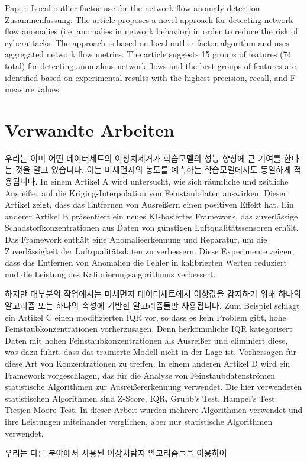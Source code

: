 Paper: Local outlier factor use for the network flow anomaly detection
Zusammenfassung: The article proposes a novel approach for detecting network flow anomalies (i.e. anomalies in network behavior) in order to reduce the risk of cyberattacks. The approach is based on local outlier factor algorithm and uses aggregated network flow metrics. The article suggests 15 groups of features (74 total) for detecting anomalous network flows and the best groups of features are identified based on experimental results with the highest precision, recall, and F-measure values.

\chapterpage\chapter{Verwandte Arbeiten}
    우리는 이미 어떤 데이터세트의 이상치제거가 학습모델의 성능 향상에 큰 기여를 한다는 것을 알고 있습니다. 이는 미세먼지의 농도를 예측하는 학습모델에서도 동일하게 적용됩니다. In einem Artikel A wird untersucht, wie sich räumliche und zeitliche Ausreißer auf die Kriging-Interpolation von Feinstaubdaten auswirken. Dieser Artikel zeigt, dass das Entfernen von Ausreißern einen positiven Effekt hat. Ein anderer Artikel B präsentiert ein neues KI-basiertes Framework, das zuverlässige Schadstoffkonzentrationen aus Daten von günstigen Luftqualitätssensoren erhält. Das Framework enthält eine Anomalieerkennung und Reparatur, um die Zuverlässigkeit der Luftqualitätsdaten zu verbessern. Diese Experimente zeigen, dass das Entfernen von Anomalien die Fehler in kalibrierten Werten reduziert und die Leistung des Kalibrierungsalgorithmus verbessert.

	하지만 대부분의 작업에서는 미세먼지 데이터세트에서 이상값을 감지하기 위해 하나의 알고리즘 또는 하나의 속성에 기반한 알고리즘들만 사용됩니다. Zum Beispiel schlagt ein Artikel C einen modifizierten IQR vor, so dass es kein Problem gibt, hohe Feinstaubkonzentrationen vorherzusagen. Denn herkömmliche IQR kategorisert Daten mit hohen Feinstaubkonzentrationen als Ausreißer und eliminiert diese, was dazu führt, dass das trainierte Modell nicht in der Lage ist, Vorhersagen für diese Art von Konzentrationen zu treffen. In einem anderen Artikel D wird ein Framework vorgeschlagen, das für die Analyse von Feinstaubdatenströmen statistische Algorithmen zur Ausreißererkennung verwendet. Die hier verwendeten statistischen Algorithmen sind Z-Score, IQR, Grubb's Test, Hampel's Test, Tietjen-Moore Test. In dieser Arbeit wurden mehrere Algorithmen verwendet und ihre Leistungen miteinander verglichen, aber nur statistische Algorithmen verwendet.

	우리는 다른 분야에서 사용된 이상치탐지 알고리즘들을 이용하여 